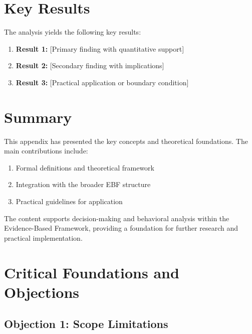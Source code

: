 \section{Key Results}
\label{sec:hec-results}

The analysis yields the following key results:

\begin{enumerate}
    \item \textbf{Result 1:} [Primary finding with quantitative support]
    \item \textbf{Result 2:} [Secondary finding with implications]
    \item \textbf{Result 3:} [Practical application or boundary condition]
\end{enumerate}


\section{Summary}
\label{sec:hec-summary}

This appendix has presented the key concepts and theoretical foundations.
The main contributions include:

\begin{enumerate}
    \item Formal definitions and theoretical framework
    \item Integration with the broader EBF structure
    \item Practical guidelines for application
\end{enumerate}

The content supports decision-making and behavioral analysis within the
Evidence-Based Framework, providing a foundation for further research
and practical implementation.



\section{Critical Foundations and Objections}
\label{sec:hec-foundations}

\subsection{Objection 1: Scope Limitations}

